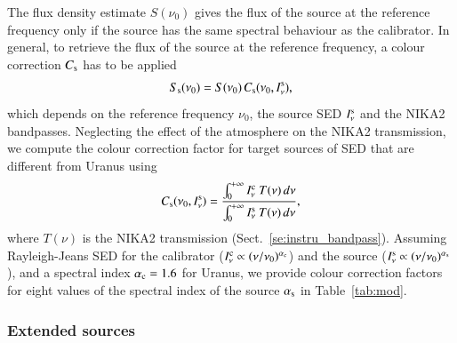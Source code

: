 The flux density estimate $S(\nu_{0})$ gives the
flux of the source at the reference frequency only if the source has
the same spectral behaviour as the calibrator. In general, to retrieve the
flux of the source at the reference frequency, a colour correction
$C_{\rm{s}}$ has to be applied
\begin{equation}
S_{\rm{s}}(\nu_{0}) = S(\nu_{0}) \,  C_{\rm{s}}(\nu_{0}, I_\nu^{\rm{s}}),
\end{equation}
which depends on the reference frequency $\nu_{0}$, the source
SED $I_\nu^{\rm{s}}$ and the NIKA2 bandpasses.
Neglecting the effect of the atmosphere on the NIKA2 transmission, we
compute the colour correction factor for target sources of SED that are
different from Uranus using
\begin{equation}
  C_{\rm{s}}(\nu_{0}, I_\nu^{\rm{s}}) = \frac{\int_{0}^{+\infty} I_\nu^{\rm{c}}~T({\nu})\, d\nu}{ \int_{0}^{+\infty} I_\nu^{\rm{s}}~ T({\nu})\, d\nu},
    \label{eq:color_correction}
\end{equation}
where $T({\nu})$ is the NIKA2 transmission
(Sect.~\ref{se:instru_bandpass}).
Assuming Rayleigh-Jeans SED for the calibrator
($I_\nu^{\rm{c}} \propto (\nu/\nu_0)^{\alpha_{\rm{c}}}$) and the source
($I_\nu^{\rm{s}} \propto (\nu/\nu_0)^{\alpha_{\rm{s}}}$), and a
spectral index $\alpha_{\rm{c}} = 1.6$ for Uranus, we provide colour
correction factors for eight values of the spectral index of the
source $\alpha_{\rm{s}}$ in Table~\ref{tab:mod}.


\subsubsection{Extended sources}
\label{se:extended_source_calib}


